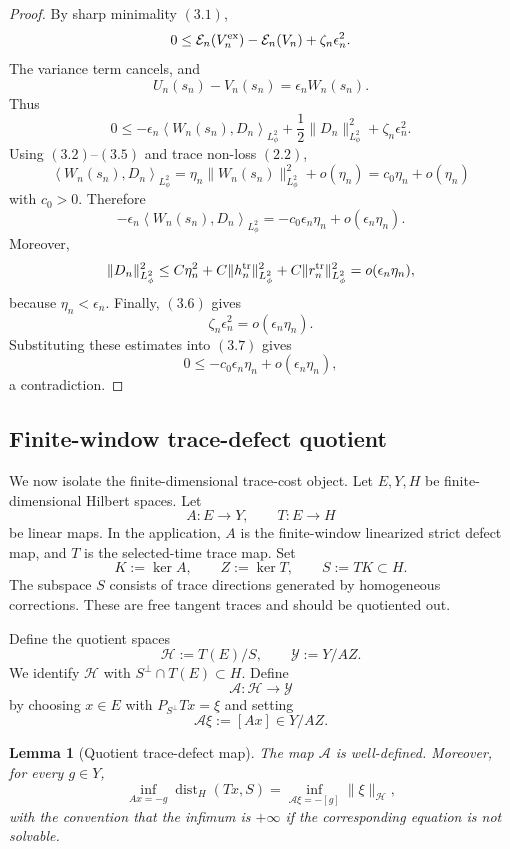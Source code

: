 \documentclass[11pt]{article}
\numberwithin{equation}{section}
\theoremstyle{plain}
\newtheorem{lemma}{Lemma}[section]
\theoremstyle{definition}
\theoremstyle{remark}
\DeclareMathOperator{\dist}{dist}
\newcommand{\ip}[2]{\left\langle #1,#2\right\rangle}
\begin{document}
\begin{proof}
By sharp minimality \((3.1)\),
\[
        0
        \le
        \mathcal E_n(V_n^{\rm ex})-\mathcal E_n(V_n)+\zeta_n\epsilon_n^2.
\]
The variance term cancels, and
\[
        U_n(s_n)-V_n(s_n)=\epsilon_nW_n(s_n).
\]
Thus
\[
        0
        \le
        -\epsilon_n\ip{W_n(s_n)}{D_n}_{L^2_\phi}
        +\frac12\|D_n\|_{L^2_\phi}^2
        +\zeta_n\epsilon_n^2.
        \tag{3.7}
\]
Using \((3.2)\)--\((3.5)\) and trace non-loss \((2.2)\),
\[
        \ip{W_n(s_n)}{D_n}_{L^2_\phi}
        =
        \eta_n\|W_n(s_n)\|_{L^2_\phi}^2+o(\eta_n)
        =
        c_0\eta_n+o(\eta_n)
\]
with \(c_0>0\).  Therefore
\[
        -\epsilon_n\ip{W_n(s_n)}{D_n}_{L^2_\phi}
        =
        -c_0\epsilon_n\eta_n+o(\epsilon_n\eta_n).
        \tag{3.8}
\]
Moreover,
\[
        \|D_n\|_{L^2_\phi}^2
        \le
        C\eta_n^2+C\|h_n^{\rm tr}\|_{L^2_\phi}^2+C\|r_n^{\rm tr}\|_{L^2_\phi}^2
        =o(\epsilon_n\eta_n),
\]
because \(\eta_n<\epsilon_n\).  Finally, \((3.6)\) gives
\[
        \zeta_n\epsilon_n^2=o(\epsilon_n\eta_n).
\]
Substituting these estimates into \((3.7)\) gives
\[
        0\le -c_0\epsilon_n\eta_n+o(\epsilon_n\eta_n),
\]
a contradiction.
\end{proof}

\subsection{Finite-window trace-defect quotient}

We now isolate the finite-dimensional trace-cost object.  Let \(E,Y,H\) be finite-dimensional Hilbert spaces.  Let
\[
        A:E\to Y,
        \qquad
        T:E\to H
\]
be linear maps.  In the application, \(A\) is the finite-window linearized strict defect map, and \(T\) is the selected-time trace map.  Set
\[
        K:=\ker A,
        \qquad
        Z:=\ker T,
        \qquad
        S:=TK\subset H.
\]
The subspace \(S\) consists of trace directions generated by homogeneous corrections.  These are free tangent traces and should be quotiented out.

Define the quotient spaces
\[
        \mathcal H:=T(E)/S,
        \qquad
        \mathcal Y:=Y/AZ.
\]
We identify \(\mathcal H\) with \(S^\perp\cap T(E)\subset H\).  Define
\[
        \mathcal A:\mathcal H\to\mathcal Y
\]
by choosing \(x\in E\) with \(P_{S^\perp}Tx=\xi\) and setting
\[
        \mathcal A\xi:=[Ax]\in Y/AZ.
\]

\begin{lemma}[Quotient trace-defect map]
\label{pV:lem:quotient-trace-defect-map}
The map \(\mathcal A\) is well-defined.  Moreover, for every \(g\in Y\),
\[
        \inf_{Ax=-g}\dist_H(Tx,S)
        =
        \inf_{\mathcal A\xi=-[g]}\|\xi\|_{\mathcal H},
        \tag{4.1}
\]
with the convention that the infimum is \(+\infty\) if the corresponding equation is not solvable.
\end{lemma}
\end{document}
